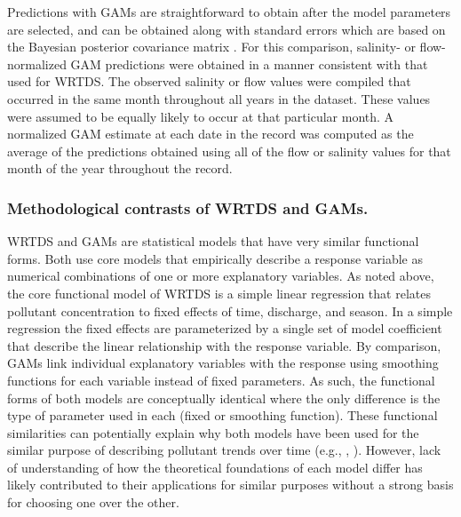 \documentclass[letterpaper,12pt,oneside]{article}\usepackage[]{graphicx}\usepackage[]{color}
\begin{document}
Predictions with \acp{GAM} are straightforward to obtain after the model parameters are selected, and can be obtained along with standard errors which are based on the Bayesian posterior covariance matrix \citep{Wood06}. For this comparison, salinity- or flow-normalized \ac{GAM} predictions were obtained in a manner consistent with that used for \ac{WRTDS}. The observed salinity or flow values were compiled that occurred in the same month throughout all years in the dataset. These values were assumed to be equally likely to occur at that particular month.  A normalized \ac{GAM} estimate at each date in the record was computed as the average of the predictions obtained using all of the flow or salinity values for that month of the year throughout the record. 

\subsubsection*{\hspace*{0.25in} Methodological contrasts of \ac{WRTDS} and \acp{GAM}.}

\ac{WRTDS} and \acp{GAM} are statistical models that have very similar functional forms. Both use core models that empirically describe a response variable as numerical combinations of one or more explanatory variables.  As noted above, the core functional model of \ac{WRTDS} is a simple linear regression that relates pollutant concentration to fixed effects of time, discharge, and season.  In a simple regression the fixed effects are parameterized by a single set of model coefficient that describe the linear relationship with the response variable.  By comparison, \acp{GAM} link individual explanatory variables with the response using smoothing functions for each variable instead of fixed parameters. As such, the functional forms of both models are conceptually identical where the only difference is the type of parameter used in each (fixed or smoothing function).  These functional similarities can potentially explain why both models have been used for the similar purpose of describing pollutant trends over time (e.g., \citealt{USGS15}, \citealt{Harding16}).  However, lack of understanding of how the theoretical foundations of each model differ has likely contributed to their applications for similar purposes without a strong basis for choosing one over the other. 
\end{document}
